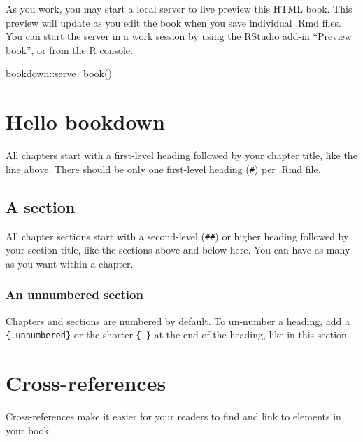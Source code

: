 \documentclass[
]{book}
\newenvironment{Shaded}{\begin{snugshade}}{\end{snugshade}}
\newcommand{\FunctionTok}[1]{\textcolor[rgb]{0.00,0.00,0.00}{#1}}
\newcommand{\NormalTok}[1]{#1}
\newcommand{\SpecialCharTok}[1]{\textcolor[rgb]{0.00,0.00,0.00}{#1}}
\theoremstyle{definition}
\theoremstyle{definition}
\theoremstyle{definition}
\theoremstyle{definition}
\theoremstyle{remark}
\begin{document}
As you work, you may start a local server to live preview this HTML book. This preview will update as you edit the book when you save individual .Rmd files. You can start the server in a work session by using the RStudio add-in ``Preview book'', or from the R console:

\begin{Shaded}
\begin{Highlighting}[]
\NormalTok{bookdown}\SpecialCharTok{::}\FunctionTok{serve\_book}\NormalTok{()}
\end{Highlighting}
\end{Shaded}

\hypertarget{hello-bookdown}{%
\section{Hello bookdown}\label{hello-bookdown}}

All chapters start with a first-level heading followed by your chapter title, like the line above. There should be only one first-level heading (\texttt{\#}) per .Rmd file.

\hypertarget{a-section}{%
\subsection{A section}\label{a-section}}

All chapter sections start with a second-level (\texttt{\#\#}) or higher heading followed by your section title, like the sections above and below here. You can have as many as you want within a chapter.

\hypertarget{an-unnumbered-section}{%
\subsubsection*{An unnumbered section}\label{an-unnumbered-section}}

Chapters and sections are numbered by default. To un-number a heading, add a \texttt{\{.unnumbered\}} or the shorter \texttt{\{-\}} at the end of the heading, like in this section.

\hypertarget{cross}{%
\section{Cross-references}\label{cross}}

Cross-references make it easier for your readers to find and link to elements in your book.
\end{document}
